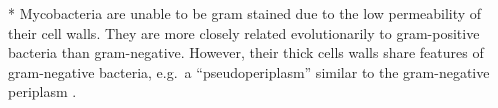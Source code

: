 * Mycobacteria are unable to be gram stained due to the low permeability
of their cell walls. They are more closely related evolutionarily to
gram-positive bacteria than gram-negative. However, their thick cells
walls share features of gram-negative bacteria, e.g.~a
``pseudoperiplasm'' similar to the gram-negative periplasm
\citep{Hett2008}.


